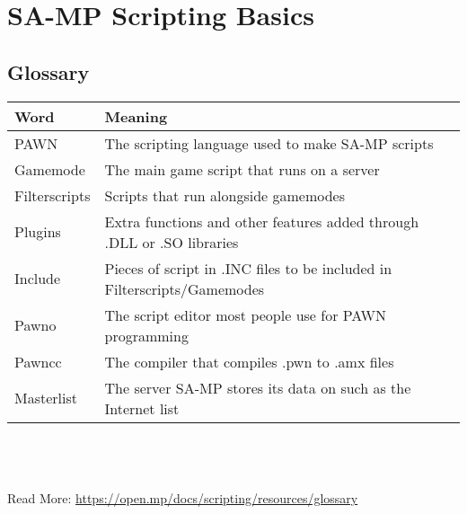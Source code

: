 \documentclass{article}
\begin{document}
\newpage
\section{SA-MP Scripting Basics}

\subsection{Glossary}
\begin{tabular}{ |l|l| } 
\hline
Word & Meaning \\
\hline
PAWN & The scripting language used to make SA-MP scripts \\
Gamemode & The main game script that runs on a server \\
Filterscripts & Scripts that run alongside gamemodes \\
Plugins & Extra functions and other features added through .DLL or .SO libraries \\
Include & Pieces of script in .INC files to be included in Filterscripts/Gamemodes \\
Pawno & The script editor most people use for PAWN programming \\
Pawncc & The compiler that compiles .pwn to .amx files \\
Masterlist & The server SA-MP stores its data on such as the Internet list \\
\hline
\end{tabular}
\\\\
\\Read More: \url{https://open.mp/docs/scripting/resources/glossary}
\end{document}
